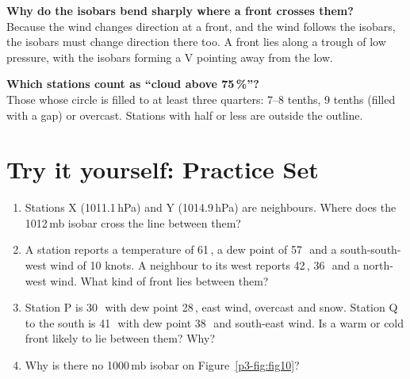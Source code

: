 \begin{askbox}
\textbf{Why do the isobars bend sharply where a front crosses them?}\\
Because the wind changes direction at a front, and the wind follows the isobars, the isobars must change direction there too. A front lies along a trough of low pressure, with the isobars forming a V pointing away from the low.
\end{askbox}

\begin{askbox}
\textbf{Which stations count as ``cloud above 75\,\%''?}\\
Those whose circle is filled to at least three quarters: 7--8 tenths, 9 tenths (filled with a gap) or overcast. Stations with half or less are outside the outline.
\end{askbox}

\section{Try it yourself: Practice Set~\thechapter}

\begin{tryit}
\begin{enumerate}[label=\textbf{\thechapter.\arabic*},leftmargin=*,itemsep=3pt]
\item Stations X (1011.1\,hPa) and Y (1014.9\,hPa) are neighbours. Where does the 1012\,mb isobar cross the line between them?
\item A station reports a temperature of 61\,\degF, a dew point of 57\,\degF\ and a south-south-west wind of 10 knots. A neighbour to its west reports 42\,\degF, 36\,\degF\ and a north-west wind. What kind of front lies between them?
\item Station P is 30\,\degF\ with dew point 28\,\degF, east wind, overcast and snow. Station Q to the south is 41\,\degF\ with dew point 38\,\degF\ and south-east wind. Is a warm or cold front likely to lie between them? Why?
\item Why is there no 1000\,mb isobar on Figure~\ref{p3-fig:fig10}?
\end{enumerate}
\end{tryit}

